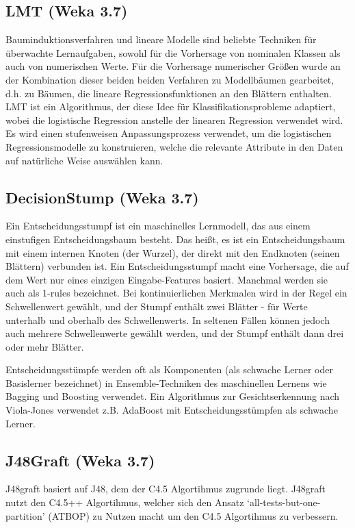 \documentclass[12pt,					%
							 oneside,			%
							 a4paper,			%
							 halfparskip,		%
							 liststotoc,			%
							 bibtotoc,			%
							 fleqn,				%
							 pointlessnumbers]	%
							 {scrreprt}
\begin{document}
		\subsection{LMT (Weka 3.7)}
			Bauminduktionsverfahren und lineare Modelle sind beliebte Techniken für überwachte Lernaufgaben, sowohl für die Vorhersage von nominalen Klassen als auch von numerischen Werte. Für die Vorhersage numerischer Größen wurde an der Kombination dieser beiden beiden Verfahren zu \glqq{}Modellbäumen\grqq{} gearbeitet, d.h. zu Bäumen, die lineare Regressionsfunktionen an den Blättern enthalten. LMT ist ein Algorithmus, der diese Idee für Klassifikationsprobleme adaptiert, wobei die logistische Regression anstelle der linearen Regression verwendet wird. Es wird einen stufenweisen Anpassungsprozess verwendet, um die logistischen Regressionsmodelle zu konstruieren, welche die relevante Attribute in den Daten auf natürliche Weise auswählen kann.\cite{Landwehr2005}
						
		\subsection{DecisionStump (Weka 3.7)}
			Ein Entscheidungsstumpf ist ein maschinelles Lernmodell, das aus einem einstufigen Entscheidungsbaum besteht. Das heißt, es ist ein Entscheidungsbaum mit einem internen Knoten (der Wurzel), der direkt mit den Endknoten (seinen Blättern) verbunden ist. Ein Entscheidungsstumpf macht eine Vorhersage, die auf dem Wert nur eines einzigen Eingabe-Features basiert. Manchmal werden sie auch als \glqq{}1-rules\grqq{} bezeichnet.	Bei kontinuierlichen Merkmalen wird in der Regel ein Schwellenwert gewählt, und der Stumpf enthält zwei Blätter - für Werte unterhalb und oberhalb des Schwellenwerts. In seltenen Fällen können jedoch auch mehrere Schwellenwerte gewählt werden, und der Stumpf enthält dann drei oder mehr Blätter.\cite{Ai92}

			Entscheidungsstümpfe werden oft als Komponenten (als \glqq{}schwache Lerner\grqq{} oder \glqq{}Basislerner\grqq{} bezeichnet) in Ensemble-Techniken des maschinellen Lernens wie Bagging und Boosting verwendet. Ein Algorithmus zur Gesichtserkennung nach Viola-Jones verwendet z.B. AdaBoost mit Entscheidungsstümpfen als schwache Lerner.\cite{Freund99}			
			
		\subsection{J48Graft (Weka 3.7)}		
			J48graft basiert auf J48, dem der C4.5 Algortihmus zugrunde liegt. J48graft nutzt den C4.5++ Algortihmus, welcher sich den Ansatz `all-tests-but-one-partition' (ATBOP) zu Nutzen macht um den C4.5 Algortihmus zu verbessern. 
			
\end{document}
